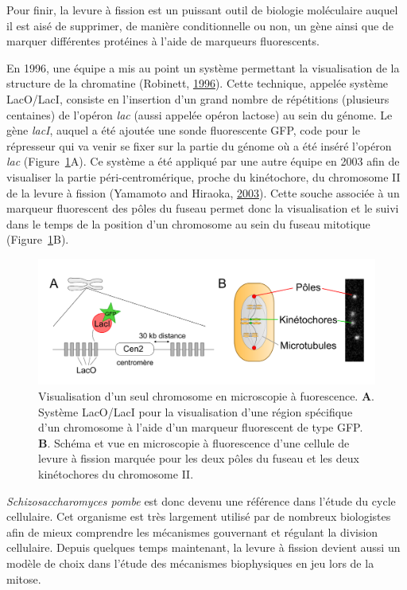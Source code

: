 \documentclass[12pt,a4paper,twoside,openright]{book}
\begin{document}
Pour finir, la levure à fission est un puissant outil de biologie
moléculaire auquel il est aisé de supprimer, de manière conditionnelle
ou non, un gène ainsi que de marquer différentes protéines à l'aide de
marqueurs fluorescents.

En 1996, une équipe a mis au point un système permettant la
visualisation de la structure de la chromatine (Robinett,
\hyperref[ref-Robinett1996]{1996}). Cette technique, appelée système
LacO/LacI, consiste en l'insertion d'un grand nombre de répétitions
(plusieurs centaines) de l'opéron \emph{lac} (aussi appelée opéron
lactose) au sein du génome. Le gène \emph{lacI}, auquel a été ajoutée
une sonde fluorescente GFP, code pour le répresseur qui va venir se
fixer sur la partie du génome où a été inséré l'opéron \emph{lac}
(Figure~\ref{fig:lac}A). Ce système a été appliqué par une autre équipe
en 2003 afin de visualiser la partie péri-centromérique, proche du
kinétochore, du chromosome II de la levure à fission (Yamamoto and
Hiraoka, \hyperref[ref-Yamamoto2003]{2003}). Cette souche associée à un
marqueur fluorescent des pôles du fuseau permet donc la visualisation et
le suivi dans le temps de la position d'un chromosome au sein du fuseau
mitotique (Figure~\ref{fig:lac}B).

\begin{figure}[htbp]
\centering
\includegraphics{figures/intro/lac.png}
\caption[Visualisation d'un seul chromosome en microscopie à fuorescence]{\label{fig:lac}Visualisation
d'un seul chromosome en microscopie à fuorescence. \textbf{A}. Système
LacO/LacI pour la visualisation d'une région spécifique d'un chromosome
à l'aide d'un marqueur fluorescent de type GFP. \textbf{B}. Schéma et
vue en microscopie à fluorescence d'une cellule de levure à fission
marquée pour les deux pôles du fuseau et les deux kinétochores du
chromosome II.}
\end{figure}

\emph{Schizosaccharomyces pombe} est donc devenu une référence dans
l'étude du cycle cellulaire. Cet organisme est très largement utilisé
par de nombreux biologistes afin de mieux comprendre les mécanismes
gouvernant et régulant la division cellulaire. Depuis quelques temps
maintenant, la levure à fission devient aussi un modèle de choix dans
l'étude des mécanismes biophysiques en jeu lors de la mitose.
\end{document}
